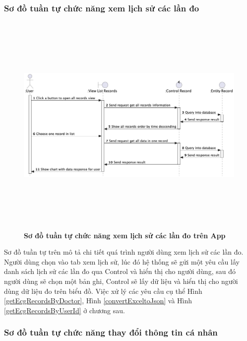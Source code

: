 \subsubsection{Sơ đồ tuần tự chức năng xem lịch sử các lần đo}

    \begin{figure}[H]
         \centering
         \includegraphics[width=16cm,height=11cm]{Images/mobile_app/view_record_timeline.png}
         \caption[Sơ đồ tuần tự chức năng xem lịch sử các lần đo trên App]{\bfseries \fontsize{12pt}{0pt}
         \selectfont Sơ đồ tuần tự chức năng xem lịch sử các lần đo trên App}
         \label{view_record_timeline} %
    \end{figure}

    Sơ đồ tuần tự trên mô tả chi tiết quá trình người dùng xem lịch sử các lần đo. Người dùng chọn vào tab xem lịch sử, 
    lúc đó hệ thống sẽ gửi một yêu cầu lấy danh sách lịch sử các lần đo qua Control và hiển thị cho người dùng, sau đó người dùng sẽ
    chọn một bản ghi, Control sẽ lấy dữ liệu và hiển thị cho người dùng dữ liệu đo trên biểu đồ. Việc xử lý các yêu cầu cụ thể
    Hình \ref{getEcgRecordsByDoctor}, Hình \ref{convertExceltoJson} và Hình \ref{getEcgRecordsByUserId} ở chương sau.

\subsubsection{Sơ đồ tuần tự chức năng thay đổi thông tin cá nhân}

